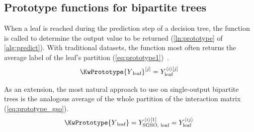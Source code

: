 %
%
%


\subsection{Prototype functions for bipartite trees}
\label{sec:prototype}

When a leaf is reached during the prediction step of a decision tree, the \KwPrototype function is called to determine the output value to be returned (\autoref{ln:prototype} of \autoref{alg:predict}).
With traditional datasets, the \KwPrototype function
most often returns the average label of the leaf's partition (\autoref{eq:prototype1})~\cite{breiman1984classification}.
%
\begin{equation}
    \KwPrototype{Y\textsubscript{leaf}}\el j=Y_\text{leaf}^{\ang{i}[j]}
    \label{eq:prototype1}
\end{equation}

As an extension, the most natural approach to use on single-output bipartite trees is the analogous average of the whole partition of the interaction matrix (\autoref{eq:prototype_gso}).
%
\begin{equation}
    \KwPrototype{Y\textsubscript{leaf}}
        = Y_\text{SGSO, leaf}^{\ang{i}[1]}
        = Y_\text{leaf}^{\ang{ij}}
    \label{eq:prototype_gso}
\end{equation}

